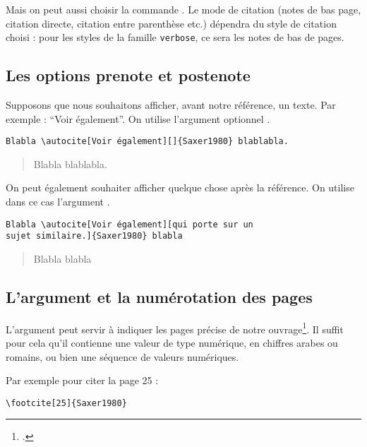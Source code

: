 Mais on peut aussi choisir la commande . Le mode de citation (notes de bas page, citation directe, citation entre parenthèse etc.) dépendra du style de citation choisi : pour les styles de la famille \verb|verbose|, ce sera les notes de bas de pages. 

\subsection{Les options prenote et postenote}

Supposons que nous souhaitons afficher, avant notre référence, un texte. Par exemple : \enquote{Voir également}. On utilise l'argument optionnel .

\begin{verbatim}
Blabla \autocite[Voir également][]{Saxer1980} blablabla.
\end{verbatim}

\begin{quotation}
Blabla \parencite[Voir également][]{Saxer1980} blablabla.
\end{quotation}



On peut également souhaiter afficher quelque chose après la référence. On utilise dans ce cas l'argument .

\begin{verbatim}
Blabla \autocite[Voir également][qui porte sur un
sujet similaire.]{Saxer1980} blabla
\end{verbatim}

\begin{quotation}

	Blabla \parencite[Voir également][qui porte sur un sujet similaire.]{Saxer1980} blabla
\end{quotation}

\subsection{L'argument  et la numérotation des pages}

L'argument  peut servir à indiquer les pages précise de notre ouvrage\footcite[On consultera pour plus de détails : ][]{biblatex_pages}. Il suffit pour cela qu'il contienne une valeur de type numérique, en chiffres arabes ou romains, ou bien une séquence de valeurs numériques.

Par exemple pour citer la page 25 : 
\begin{verbatim}
\footcite[25]{Saxer1980}
\end{verbatim}

